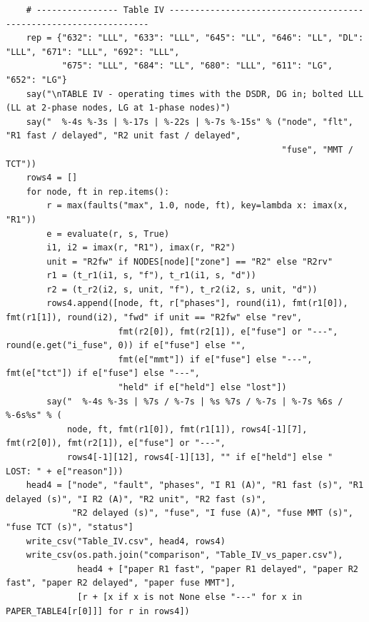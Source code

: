 \documentclass[12pt,a4paper]{article}
\begin{document}
\begin{lstlisting}
    # ---------------- Table IV ------------------------------------------------------------------
    rep = {"632": "LLL", "633": "LLL", "645": "LL", "646": "LL", "DL": "LLL", "671": "LLL", "692": "LLL",
           "675": "LLL", "684": "LL", "680": "LLL", "611": "LG", "652": "LG"}
    say("\nTABLE IV - operating times with the DSDR, DG in; bolted LLL (LL at 2-phase nodes, LG at 1-phase nodes)")
    say("  %-4s %-3s | %-17s | %-22s | %-7s %-15s" % ("node", "flt", "R1 fast / delayed", "R2 unit fast / delayed",
                                                      "fuse", "MMT / TCT"))
    rows4 = []
    for node, ft in rep.items():
        r = max(faults("max", 1.0, node, ft), key=lambda x: imax(x, "R1"))
        e = evaluate(r, s, True)
        i1, i2 = imax(r, "R1"), imax(r, "R2")
        unit = "R2fw" if NODES[node]["zone"] == "R2" else "R2rv"
        r1 = (t_r1(i1, s, "f"), t_r1(i1, s, "d"))
        r2 = (t_r2(i2, s, unit, "f"), t_r2(i2, s, unit, "d"))
        rows4.append([node, ft, r["phases"], round(i1), fmt(r1[0]), fmt(r1[1]), round(i2), "fwd" if unit == "R2fw" else "rev",
                      fmt(r2[0]), fmt(r2[1]), e["fuse"] or "---", round(e.get("i_fuse", 0)) if e["fuse"] else "",
                      fmt(e["mmt"]) if e["fuse"] else "---", fmt(e["tct"]) if e["fuse"] else "---",
                      "held" if e["held"] else "lost"])
        say("  %-4s %-3s | %7s / %-7s | %s %7s / %-7s | %-7s %6s / %-6s%s" % (
            node, ft, fmt(r1[0]), fmt(r1[1]), rows4[-1][7], fmt(r2[0]), fmt(r2[1]), e["fuse"] or "---",
            rows4[-1][12], rows4[-1][13], "" if e["held"] else "   LOST: " + e["reason"]))
    head4 = ["node", "fault", "phases", "I R1 (A)", "R1 fast (s)", "R1 delayed (s)", "I R2 (A)", "R2 unit", "R2 fast (s)",
             "R2 delayed (s)", "fuse", "I fuse (A)", "fuse MMT (s)", "fuse TCT (s)", "status"]
    write_csv("Table_IV.csv", head4, rows4)
    write_csv(os.path.join("comparison", "Table_IV_vs_paper.csv"),
              head4 + ["paper R1 fast", "paper R1 delayed", "paper R2 fast", "paper R2 delayed", "paper fuse MMT"],
              [r + [x if x is not None else "---" for x in PAPER_TABLE4[r[0]]] for r in rows4])


\end{lstlisting}
\end{document}
